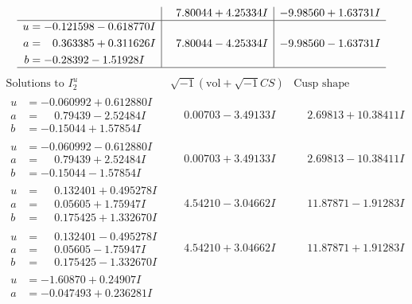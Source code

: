\documentclass[1p]{elsarticle_modified}
\theoremstyle{definition}
\newcommand{\I}{\sqrt{-1}}
\begin{document}
$$\begin{array}{c|c|c}
 & \phantom{-}7.80044 + 4.25334 I & -9.98560 + 1.63731 I \\ \hline\begin{aligned}
u &= -0.121598 - 0.618770 I \\
a &= \phantom{-}0.363385 + 0.311626 I \\
b &= -0.28392 - 1.51928 I\end{aligned}
 & \phantom{-}7.80044 - 4.25334 I & -9.98560 - 1.63731 I\\
 \hline 
 \end{array}$$\newpage$$\begin{array}{c|c|c}  
\text{Solutions to }I^u_{2}& \I (\text{vol} + \sqrt{-1}CS) & \text{Cusp shape}\\
 \hline 
\begin{aligned}
u &= -0.060992 + 0.612880 I \\
a &= \phantom{-}0.79439 - 2.52484 I \\
b &= -0.15044 + 1.57854 I\end{aligned}
 & \phantom{-}0.00703 - 3.49133 I & \phantom{-}2.69813 + 10.38411 I \\ \hline\begin{aligned}
u &= -0.060992 - 0.612880 I \\
a &= \phantom{-}0.79439 + 2.52484 I \\
b &= -0.15044 - 1.57854 I\end{aligned}
 & \phantom{-}0.00703 + 3.49133 I & \phantom{-}2.69813 - 10.38411 I \\ \hline\begin{aligned}
u &= \phantom{-}0.132401 + 0.495278 I \\
a &= \phantom{-}0.05605 + 1.75947 I \\
b &= \phantom{-}0.175425 + 1.332670 I\end{aligned}
 & \phantom{-}4.54210 - 3.04662 I & \phantom{-}11.87871 - 1.91283 I \\ \hline\begin{aligned}
u &= \phantom{-}0.132401 - 0.495278 I \\
a &= \phantom{-}0.05605 - 1.75947 I \\
b &= \phantom{-}0.175425 - 1.332670 I\end{aligned}
 & \phantom{-}4.54210 + 3.04662 I & \phantom{-}11.87871 + 1.91283 I \\ \hline\begin{aligned}
u &= -1.60870 + 0.24907 I \\
a &= -0.047493 + 0.236281 I \\

\end{aligned}
\end{array}$$
\end{document}
